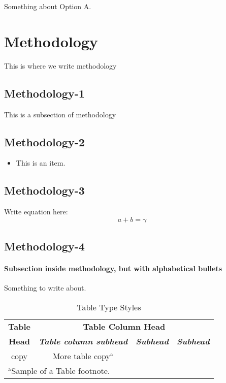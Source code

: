 \documentclass[conference]{IEEEtran}
\begin{document}
Something about Option A.

\section{Methodology}
This is where we write methodology

\subsection{Methodology-1}\label{AA}
This is a subsection of methodology 

\subsection{Methodology-2}
\begin{itemize}
\item This is an item.
\end{itemize}

\subsection{Methodology-3}
Write equation here:
\begin{equation}
a+b=\gamma\label{eq}
\end{equation}

\subsection{Methodology-4}
\paragraph{Subsection inside methodology, but with alphabetical bullets} Something to write about.
\begin{table}[htbp]
\caption{Table Type Styles}
\begin{center}
\begin{tabular}{|c|c|c|c|}
\hline
\textbf{Table}&\multicolumn{3}{|c|}{\textbf{Table Column Head}} \\
\cline{2-4} 
\textbf{Head} & \textbf{\textit{Table column subhead}}& \textbf{\textit{Subhead}}& \textbf{\textit{Subhead}} \\
\hline
copy& More table copy$^{\mathrm{a}}$& &  \\
\hline
\multicolumn{4}{l}{$^{\mathrm{a}}$Sample of a Table footnote.}
\end{tabular}
\label{tab1}
\end{center}
\end{table}
\end{document}
